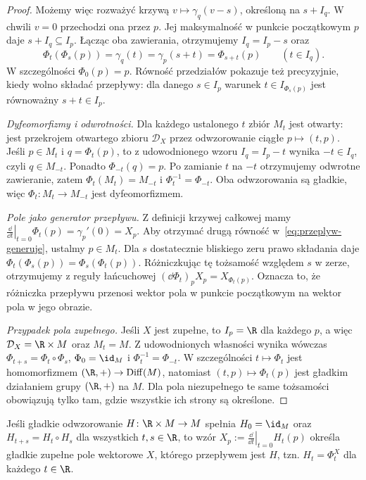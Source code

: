 \begin{proof}
Możemy więc rozważyć krzywą
$v\mapsto\gamma_q(v-s)$, określoną na $s+I_q$.
W chwili $v=0$ przechodzi ona przez $p$. Jej maksymalność
w punkcie początkowym $p$ daje $s+I_q\subseteq I_p$.
Łącząc oba zawierania, otrzymujemy $I_q=I_p-s$ oraz
\[
\Phi_t(\Phi_s(p))=\gamma_q(t)=\gamma_p(s+t)=\Phi_{s+t}(p)
\qquad (t\in I_q).
\]
W szczególności $\Phi_0(p)=p$.
Równość przedziałów pokazuje też precyzyjnie, kiedy wolno
składać przepływy: dla danego $s\in I_p$ warunek
$t\in I_{\Phi_s(p)}$ jest równoważny $s+t\in I_p$.

\medskip
\noindent\emph{Dyfeomorfizmy i odwrotności.}
Dla każdego ustalonego $t$ zbiór $M_t$ jest otwarty:
jest przekrojem otwartego zbioru $\mathcal D_X$
przez odwzorowanie ciągłe $p\mapsto(t,p)$.
Jeśli $p\in M_t$ i $q=\Phi_t(p)$, to z udowodnionego wzoru
$I_q=I_p-t$ wynika $-t\in I_q$, czyli $q\in M_{-t}$.
Ponadto $\Phi_{-t}(q)=p$. Po zamianie $t$ na $-t$
otrzymujemy odwrotne zawieranie, zatem
$\Phi_t(M_t)=M_{-t}$ i
$\Phi_t^{-1}=\Phi_{-t}$. Oba odwzorowania są gładkie,
więc $\Phi_t\colon M_t\to M_{-t}$ jest dyfeomorfizmem.

\medskip
\noindent\emph{Pole jako generator przepływu.}
Z definicji krzywej całkowej mamy
$\left.\frac{\dd}{\dd t}\right|_{t=0}\Phi_t(p)
=\gamma_p'(0)=X_p$.
Aby otrzymać drugą równość w~\eqref{eq:przeplyw-generuje},
ustalmy $p\in M_t$. Dla $s$ dostatecznie bliskiego zeru
prawo składania daje
$\Phi_t(\Phi_s(p))=\Phi_s(\Phi_t(p))$.
Różniczkując tę tożsamość względem $s$ w zerze,
otrzymujemy z reguły łańcuchowej
$(\dd\Phi_t)_pX_p=X_{\Phi_t(p)}$.
Oznacza to, że różniczka przepływu przenosi wektor pola
w punkcie początkowym na wektor pola w jego obrazie.

\medskip
\noindent\emph{Przypadek pola zupełnego.}
Jeśli $X$ jest zupełne, to $I_p=\R$ dla każdego $p$,
a więc $\mathcal D_X=\R\times M$ oraz $M_t=M$.
Z udowodnionych własności wynika wówczas
$\Phi_{t+s}=\Phi_t\circ\Phi_s$,
$\Phi_0=\id_M$ i $\Phi_t^{-1}=\Phi_{-t}$.
W szczególności $t\mapsto\Phi_t$ jest homomorfizmem
$(\R,+)\to\operatorname{Diff}(M)$, natomiast
$(t,p)\mapsto\Phi_t(p)$ jest gładkim działaniem grupy
$(\R,+)$ na $M$. Dla pola niezupełnego te same tożsamości
obowiązują tylko tam, gdzie wszystkie ich strony są określone.
\end{proof}

\begin{stwierdzenie}
Jeśli gładkie odwzorowanie $H\colon\R\times M\to M$ spełnia
$H_0=\id_M$ oraz $H_{t+s}=H_t\circ H_s$ dla wszystkich
$t,s\in\R$, to wzór
$X_p:=\left.\frac{\dd}{\dd t}\right|_{t=0}H_t(p)$
określa gładkie zupełne pole wektorowe $X$, którego
przepływem jest $H$, tzn. $H_t=\Phi_t^X$ dla każdego $t\in\R$.
\end{stwierdzenie}

